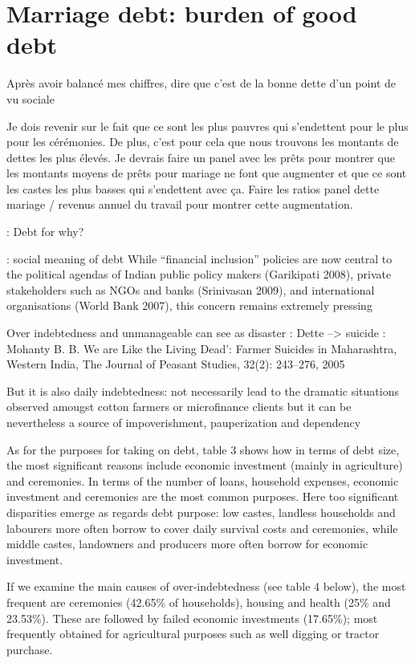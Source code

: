 \documentclass[a4paper, 11pt, onecolumn]{article}
\begin{document}
\section{Marriage debt: burden of good debt}

Après avoir balancé mes chiffres, dire que c'est de la bonne dette d'un point de vu sociale

Je dois revenir sur le fait que ce sont les plus pauvres qui s'endettent pour le plus pour les cérémonies. De plus, c'est pour cela que nous trouvons les montants de dettes les plus élevés.
Je devrais faire un panel avec les prêts pour montrer que les montants moyens de prêts pour mariage ne font que augmenter et que ce sont les castes les plus basses qui s'endettent avec ça.
Faire les ratios panel dette mariage / revenus annuel du travail pour montrer cette augmentation.


\cite{Guerin2012} : Debt for why?



\cite{Guerin2014a} : social meaning of debt
While “financial inclusion” policies are now central to the political agendas of Indian public
policy makers (Garikipati 2008), private stakeholders such as NGOs and banks (Srinivasan
2009), and international organisations (World Bank 2007), this concern remains extremely
pressing

Over indebtedness and unmanageable can see as disaster : 
Dette --> suicide : Mohanty B. B. We are Like the Living Dead’: Farmer Suicides in Maharashtra, Western India, The Journal
of Peasant Studies, 32(2): 243–276, 2005

But it is also daily indebtedness: not necessarily lead to the dramatic situations observed amougst cotton farmers or microfinance clients but it can be nevertheless a source of impoverishment, pauperization and dependency \citep{Guerin2014a}

As for
the purposes for taking on debt, table 3 shows how in terms of debt size, the most significant
reasons include economic investment (mainly in agriculture) and ceremonies. In terms of the
number of loans, household expenses, economic investment and ceremonies are the most
common purposes. Here too significant disparities emerge as regards debt purpose: low castes, landless households and labourers more often borrow to cover daily survival costs and
ceremonies, while middle castes, landowners and producers more often borrow for economic
investment.

If we examine the main causes of over-indebtedness (see table 4 below), the most frequent are
ceremonies (42.65\% of households), housing and health (25\% and 23.53\%). These are
followed by failed economic investments (17.65\%); most frequently obtained for agricultural
purposes such as well digging or tractor purchase. 
\end{document}
